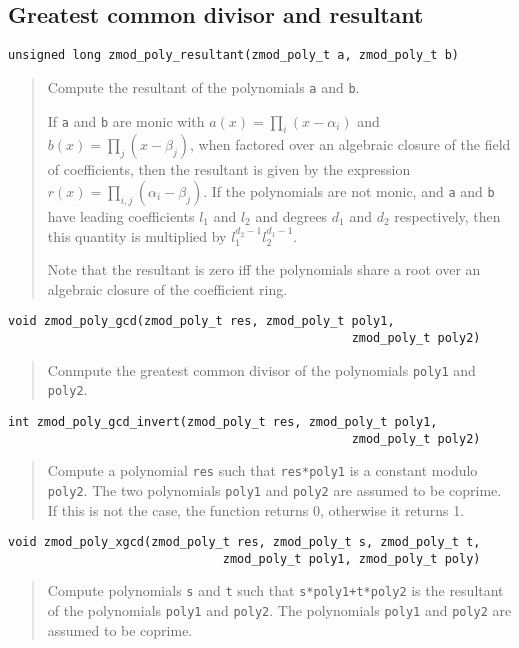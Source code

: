 \documentclass[a4paper,10pt]{article}
\newcommand{\code}{\lstinline}
\begin{document}
\subsection{Greatest common divisor and resultant}
\begin{lstlisting}
unsigned long zmod_poly_resultant(zmod_poly_t a, zmod_poly_t b)
\end{lstlisting}
\begin{quote}
Compute the resultant of the polynomials \code{a} and \code{b}. 

If \code{a} and \code{b} are monic with $a(x) = \prod_i (x - \alpha_i)$ and $b(x) = \prod_j (x - \beta_j)$, when factored over an algebraic closure of the field of coefficients, then the resultant is given by the expression $r(x) = \prod_{i,j} (\alpha_i - \beta_j)$. If the polynomials are not monic, and \code{a} and \code{b} have leading coefficients $l_1$ and $l_2$ and degrees $d_1$ and $d_2$ respectively, then this quantity is multiplied by $l_1^{d_2-1}l_2^{d_1-1}$.

Note that the resultant is zero iff the polynomials share a root over an algebraic closure of the coefficient ring.

\end{quote}

\begin{lstlisting}
void zmod_poly_gcd(zmod_poly_t res, zmod_poly_t poly1, 
                                                zmod_poly_t poly2)
\end{lstlisting}
\begin{quote}
Conmpute the greatest common divisor of the polynomials \code{poly1} and \code{poly2}.
\end{quote}

\begin{lstlisting}
int zmod_poly_gcd_invert(zmod_poly_t res, zmod_poly_t poly1, 
                                                zmod_poly_t poly2)
\end{lstlisting}
\begin{quote}
Compute a polynomial \code{res} such that \code{res*poly1} is a constant modulo \code{poly2}. The two polynomials \code{poly1} and \code{poly2} are assumed to be coprime. If this is not the case, the function returns 0, otherwise it returns 1.
\end{quote}

\begin{lstlisting}
void zmod_poly_xgcd(zmod_poly_t res, zmod_poly_t s, zmod_poly_t t,  
                              zmod_poly_t poly1, zmod_poly_t poly)
\end{lstlisting}
\begin{quote}
Compute polynomials \code{s} and \code{t} such that \code{s*poly1+t*poly2} is the resultant of the polynomials \code{poly1} and \code{poly2}. The polynomials \code{poly1} and \code{poly2} are assumed to be coprime.
\end{quote}
\end{document}
